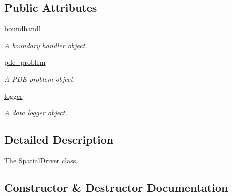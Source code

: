 \subsection*{Public Attributes}
\begin{DoxyCompactItemize}
\item 
\hyperlink{classMain__PDE__Repo_1_1src_1_1spatial__driver_1_1SpatialDriver_a8e4da2dd5010a3f8e63f2a6aa28ffabf}{boundhandl}
\begin{DoxyCompactList}\small\item\em A boundary handler object. \end{DoxyCompactList}\item 
\hyperlink{classMain__PDE__Repo_1_1src_1_1spatial__driver_1_1SpatialDriver_a2a61190d268b74c9388d3bbe3e3cce93}{pde\+\_\+problem}
\begin{DoxyCompactList}\small\item\em A P\+DE problem object. \end{DoxyCompactList}\item 
\hyperlink{classMain__PDE__Repo_1_1src_1_1spatial__driver_1_1SpatialDriver_aac2299eb18270b9cc3c17d2d07e0dc57}{logger}
\begin{DoxyCompactList}\small\item\em A data logger object. \end{DoxyCompactList}\end{DoxyCompactItemize}


\subsection{Detailed Description}
The \hyperlink{classMain__PDE__Repo_1_1src_1_1spatial__driver_1_1SpatialDriver}{Spatial\+Driver} class. 

\subsection{Constructor \& Destructor Documentation}
\mbox{\label{classMain__PDE__Repo_1_1src_1_1spatial__driver_1_1SpatialDriver_a7e08a0ce817760d8ea8c4e146ab1a82d}} 
